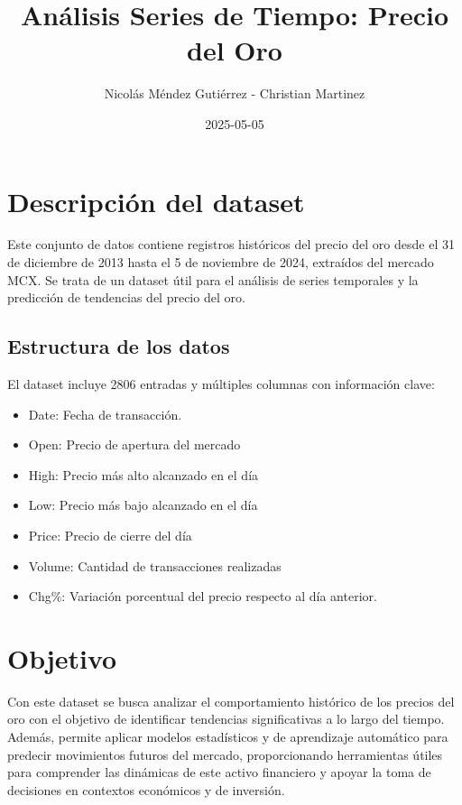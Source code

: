 \documentclass[
]{book}
\title{Análisis Series de Tiempo: Precio del Oro}
\author{Nicolás Méndez Gutiérrez - Christian Martinez}
\date{2025-05-05}
\providecommand{\tightlist}{%
  \setlength{\itemsep}{0pt}\setlength{\parskip}{0pt}}
\begin{document}
\maketitle

{
\setcounter{tocdepth}{1}
\tableofcontents
}
\chapter{Descripción del dataset}\label{descripciuxf3n-del-dataset}

Este conjunto de datos contiene registros históricos del precio del oro desde el 31 de diciembre de 2013 hasta el 5 de noviembre de 2024, extraídos del mercado MCX. Se trata de un dataset útil para el análisis de series temporales y la predicción de tendencias del precio del oro.

\section{Estructura de los datos}\label{estructura-de-los-datos}

El dataset incluye 2806 entradas y múltiples columnas con información clave:

\begin{itemize}
\tightlist
\item
  Date: Fecha de transacción.
\item
  Open: Precio de apertura del mercado
\item
  High: Precio más alto alcanzado en el día
\item
  Low: Precio más bajo alcanzado en el día
\item
  Price: Precio de cierre del día
\item
  Volume: Cantidad de transacciones realizadas
\item
  Chg\%: Variación porcentual del precio respecto al día anterior.
\end{itemize}

\chapter{Objetivo}\label{objetivo}

Con este dataset se busca analizar el comportamiento histórico de los precios del oro con el objetivo de identificar tendencias significativas a lo largo del tiempo. Además, permite aplicar modelos estadísticos y de aprendizaje automático para predecir movimientos futuros del mercado, proporcionando herramientas útiles para comprender las dinámicas de este activo financiero y apoyar la toma de decisiones en contextos económicos y de inversión.
\end{document}
